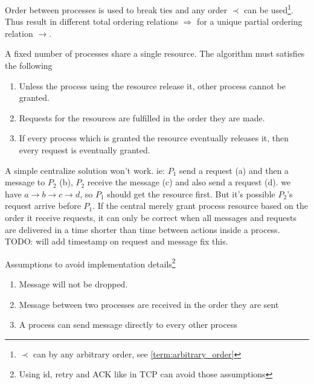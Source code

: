 \documentclass[12pt,a4paper,oneside]{article}
\begin{document}
Order between processes is used to break ties and any order $\prec$ can be used\footnote{$\prec$ can by any arbitrary order, see \ref{term:arbitrary_order}}.
Thus result in different total ordering relations $\Rightarrow$ for a unique partial ordering relation $\rightarrow$.


A fixed number of processes share a single resource. The algorithm must satisfies the following

\begin{enumerate}
  \item Unless the process using the resource release it, other process cannot be granted.
  \item Requests for the resources are fulfilled in the order they are made.
  \item If every process which is granted the resource eventually releases it, then every request is eventually granted\cite{l}.
\end{enumerate}

A simple centralize solution won't work. ie: $P_1$ send a request (a) and then a message to $P_2$ (b), $P_2$ receive the message (c) and also send a request (d).
we have $a \rightarrow b \rightarrow c \rightarrow d$, so $P_1$ should get the resource first. But it's possible $P_2$'s request arrive before $P_1$.
If the central merely grant process resource based on the order it receive requests, it can only be correct when all messages and requests are delivered in a time
shorter than time between actions inside a process.
TODO: will add timestamp on request and message fix this.


Assumptions to avoid implementation details\footnote{Using id, retry and ACK like in TCP can avoid those assumptions}

\begin{enumerate}
  \item Message will not be dropped.
  \item Message between two processes are received in the order they are sent
  \item A process can send message directly to every other process
\end{enumerate}
\end{document}
